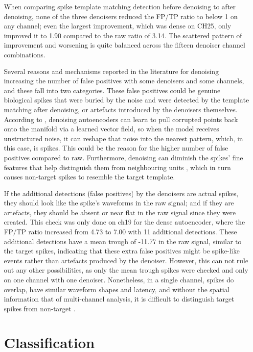 \documentclass[ %
                    author={Rzan Alkabier},
                    supervisor={Dr. Zahraa Abdallah},
                    degree={MSc},
                     title={Denoising Extracellular Recording for Spike Detection and Classification on Single Channels},
                    subtitle={Does denoising improve detection and classification performance?},
                      type={},
                      year={2026}]{dissertation}
\begin{document}
When comparing spike template matching detection before denoising to after denoising, none of the three denoisers reduced the FP/TP ratio to below 1 on any channel; even the largest improvement, which was dense on CH25, only improved it to 1.90 compared to the raw ratio of 3.14. The scattered pattern of improvement and worsening is quite balanced across the fifteen denoiser channel combinations. 
\bigskip

\noindent
Several reasons and mechanisms reported in the literature for denoising increasing the number of false positives with some denoisers and some channels, and these fall into two categories. These false positives could be genuine biological spikes that were buried by the noise and were detected by the template matching after denoising, or artefacts introduced by the denoisers themselves.
According to \cite{bengio_generalized_2013}, denoising autoencoders can learn to pull corrupted points back onto the manifold via a learned vector field, so when the model receives unstructured noise, it can reshape that noise into the nearest pattern, which, in this case, is spikes. This could be the reason for the higher number of false positives compared to raw. Furthermore, denoising can diminish the spikes' fine features that help distinguish them from neighbouring units \cite{baldazzi_systematic_2020}, which in turn causes non-target spikes to resemble the target template. 
\bigskip

\noindent
If the additional detections (false positives) by the denoisers are actual spikes, they should look like the spike's waveforms in the raw signal; and if they are artefacts, they should be absent or near flat in the raw signal since they were created. This check was only done on ch19 for the dense autoencoder, where the FP/TP ratio increased from 4.73 to 7.00 with 11 additional detections. These additional detections have a mean trough of -11.77 in the raw signal, similar to the target spikes, indicating that these extra false positives might be spike-like events rather than artefacts produced by the denoiser. However, this can not rule out any other possibilities, as only the mean trough spikes were checked and only on one channel with one denoiser. Nonetheless, in a single channel, spikes do overlap, have similar waveform shapes and latency, and without the spatial information that of multi-channel analysis, it is difficult to distinguish target spikes from non-target \cite{troglio_hybrid_2026}.
\section{Classification}
\end{document}
